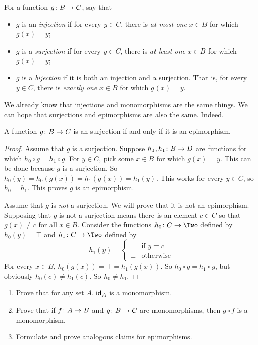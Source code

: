 \begin{defn}
	For a function ${g}\colon{B}\to{C}$, say that
	\begin{itemize}
		\item $g$ is an \emph{injection} if for every $y\in C$, there is \emph{at most one} $x\in B$ for which $g(x)=y$;
		\item $g$ is a \emph{surjection} if for every $y\in C$, there is \emph{at least one} $x\in B$ for which $g(x)=y$;
		\item $g$ is a \emph{bijection} if it is both an injection and a surjection. That is, for every $y\in C$, there is \emph{exactly one} $x\in B$ for which $g(x)=y$. 
	\end{itemize}  
\end{defn}

We already know that injections and monomorphisms are the same things. We can hope that surjections and epimorphisms are also the same. Indeed.

\begin{lemma}
	A function ${g}\colon{B}\to{C}$ is an surjection if and only if it is an epimorphism.
	\begin{proof}
		Assume that $g$ is a surjection. 
		Suppose ${h_0,h_1}\colon{B}\to{D}$ are functions for which $h_0\circ g = h_1\circ g$. 
		For $y\in C$, pick some $x\in B$ for which $g(x)=y$.
		This can be done because $g$ is a surjection.
		So $h_0(y) = h_0(g(x)) = h_1(g(x)) = h_1(y)$.
		This works for every $y\in C$, so $h_0=h_1$.
		This proves $g$ is an epimorphism.
		
		Assume that $g$ is \emph{not} a surjection.
		We will prove that it is not an epimorphism.
		Supposing that $g$ is not a surjection means there is an element $c\in C$ so that $g(x)\neq c$ for all $x\in B$. 
		Consider the functions $\fromto {h_0}C\Two$ defined by $h_0(y)=\top$ and $\fromto {h_1}C\Two$ defined by 
		\[h_1(y) = \begin{cases}
			\top & \text{if  $y=c$}\\
			\bot &\text {otherwise}
		\end{cases}
		\]
		For every $x\in B$, $h_0(g(x)) = \top = h_1(g(x))$. So $h_0\circ g = h_1\circ g$, but obviously $h_0(c)\neq h_1(c)$. So $h_0\neq h_1$.  
	\end{proof}
\end{lemma}

\begin{exercises}
	\begin{enumerate}
		\item Prove that for any set $A$, $\textsf{id}_A$ is a monomorphism.
		\item Prove that if ${f}\colon{A}\to{B}$ and ${g}\colon{B}\to{C}$ are monomorphisms, then $g\circ f$ is a monomorphism.
		\item Formulate and prove analogous claims for epimorphisms.
	\end{enumerate}
\end{exercises}


